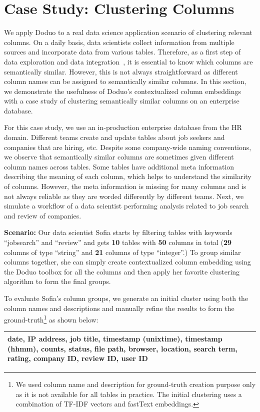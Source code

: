 \documentclass[sigconf]{acmart}
\newcommand{\name}{\mbox{\sc Doduo}}
\newcommand{\hll}[1]{#1}
\newcommand{\hlll}[1]{#1}
\newcommand{\revcr}[1]{#1}
\begin{document}
\section{Case Study: Clustering Columns}
\hll{
We apply \name{} to a real data science application scenario of clustering relevant columns.
%
On a daily basis, data scientists collect information from multiple sources and incorporate data from various tables. Therefore, as a first step of data exploration and data integration~\cite{Ota:2020:D4:VLDB}, it is essential to know which columns are semantically similar. However, this is not always straightforward as different column names can be assigned to semantically similar columns. 
%
In this section, we demonstrate the usefulness of \name's contextualized column embeddings with a case study of clustering semantically similar columns on an enterprise database.


For this case study, we use an in-production enterprise database from the HR domain. Different teams create and update tables about job seekers and companies that are hiring, etc. Despite some company-wide naming conventions, we observe that semantically similar columns are sometimes given different column names across tables. 
%
Some tables have additional meta information describing the meaning of each column, which helps to understand the similarity of columns. However, the meta information is missing for many columns and is not always reliable as they are worded differently  by different teams.
%
Next, we simulate a workflow of a data scientist performing analysis related to job search and review of companies.


\smallskip
\noindent
{\bf Scenario:}
Our data scientist \hlll{Sofia} starts by filtering tables with keywords ``jobsearch'' and ``review'' and gets {\bf 10} tables with {\bf 50} columns in total ({\bf 29} columns of type ``string'' and {\bf 21} columns of type ``integer''.)
%
To group similar columns together, she can simply create contextualized column embedding using the \name{} toolbox for all the columns and then apply her favorite clustering algorithm to form the final groups.

\hlll{To evaluate Sofia's column groups}, we generate an initial cluster using both the column names and descriptions and manually refine the results to form the ground-truth\footnote{We used column name and description for ground-truth creation purpose only as it is not available for all tables in practice. The initial clustering uses a combination of TF-IDF vectors and fastText embeddings.} \revcr{as shown below:}
{
\begin{table}[h]
\footnotesize
\begin{tabular}{|p{8cm}|}\hline
date, IP address, job title, timestamp (unixtime), timestamp (hhmm), counts, status, file path, browser, location, search term, rating, company ID, review ID, user ID \\\hline
\end{tabular}
\end{table}
}

}
\end{document}
